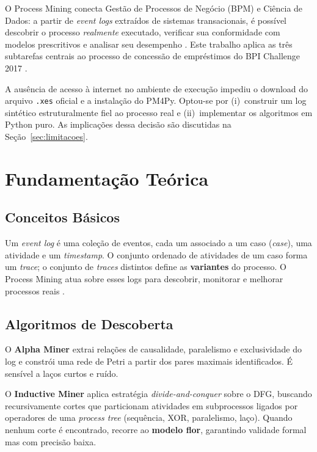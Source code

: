 \documentclass[12pt,a4paper]{article}
\begin{document}
O Process Mining conecta Gestão de Processos de Negócio (BPM) e Ciência de Dados: a partir de \textit{event logs} extraídos de sistemas transacionais, é possível descobrir o processo \emph{realmente} executado, verificar sua conformidade com modelos prescritivos e analisar seu desempenho \cite{vanderAalst2016,manifesto2011}. Este trabalho aplica as três subtarefas centrais ao processo de concessão de empréstimos do BPI Challenge 2017 \cite{vanDongen2017}.

A ausência de acesso à internet no ambiente de execução impediu o download do arquivo \texttt{.xes} oficial e a instalação do PM4Py. Optou-se por (i)~construir um log sintético estruturalmente fiel ao processo real e (ii)~implementar os algoritmos em Python puro. As implicações dessa decisão são discutidas na Seção~\ref{sec:limitacoes}.

\section{Fundamentação Teórica}

\subsection{Conceitos Básicos}

Um \textit{event log} é uma coleção de eventos, cada um associado a um caso (\textit{case}), uma atividade e um \textit{timestamp}. O conjunto ordenado de atividades de um caso forma um \textit{trace}; o conjunto de \textit{traces} distintos define as \textbf{variantes} do processo. O Process Mining atua sobre esses logs para descobrir, monitorar e melhorar processos reais \cite{vanderAalst2016}.

\subsection{Algoritmos de Descoberta}

O \textbf{Alpha Miner} \cite{vanderAalst2004} extrai relações de causalidade, paralelismo e exclusividade do log e constrói uma rede de Petri a partir dos pares maximais identificados. É sensível a laços curtos e ruído.

O \textbf{Inductive Miner} \cite{leemans2013} aplica estratégia \textit{divide-and-conquer} sobre o DFG, buscando recursivamente cortes que particionam atividades em subprocessos ligados por operadores de uma \textit{process tree} (sequência, XOR, paralelismo, laço). Quando nenhum corte é encontrado, recorre ao \textbf{modelo flor}, garantindo validade formal mas com precisão baixa.
\end{document}
